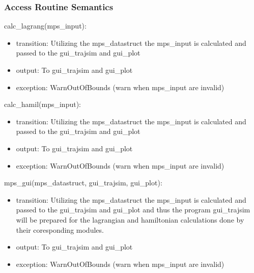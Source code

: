 \documentclass[12pt, titlepage]{article}
\begin{document}
\subsubsection{Access Routine Semantics}

\noindent calc\_lagrang(mps\_input):
\begin{itemize}
\item transition: Utilizing the mps\_datastruct the mps\_input is calculated and passed to the gui\_trajsim and gui\_plot  
\item output: To gui\_trajsim and gui\_plot  
\item exception: WarnOutOfBounds (warn when mps\_input are invalid)  
\end{itemize}

\noindent calc\_hamil(mps\_input):
\begin{itemize}
\item transition: Utilizing the mps\_datastruct the mps\_input is calculated and passed to the gui\_trajsim and gui\_plot  
\item output: To gui\_trajsim and gui\_plot  
\item exception: WarnOutOfBounds (warn when mps\_input are invalid)  
\end{itemize}

\noindent mps\_gui(mps\_datastruct, gui\_trajsim, gui\_plot):
\begin{itemize}
\item transition: Utilizing the mps\_datastruct the mps\_input is calculated and passed to the gui\_trajsim and gui\_plot 
and thus the program gui\_trajsim will be prepared for the lagrangian and hamiltonian calculations done by their 
coresponding modules.
\item output: To gui\_trajsim and gui\_plot  
\item exception: WarnOutOfBounds (warn when mps\_input are invalid)  
\end{itemize}


\end{document}
